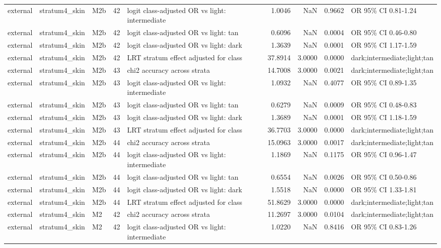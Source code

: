 \begin{tabular}{lllrlrrrl}
external & stratum4\_skin & M2b & 42 & logit class-adjusted OR vs light: intermediate & 1.0046 & NaN & 0.9662 & OR 95\% CI 0.81-1.24 \\
external & stratum4\_skin & M2b & 42 & logit class-adjusted OR vs light: tan & 0.6096 & NaN & 0.0004 & OR 95\% CI 0.46-0.80 \\
external & stratum4\_skin & M2b & 42 & logit class-adjusted OR vs light: dark & 1.3639 & NaN & 0.0001 & OR 95\% CI 1.17-1.59 \\
external & stratum4\_skin & M2b & 42 & LRT stratum effect adjusted for class & 37.8914 & 3.0000 & 0.0000 & dark;intermediate;light;tan \\
external & stratum4\_skin & M2b & 43 & chi2 accuracy across strata & 14.7008 & 3.0000 & 0.0021 & dark;intermediate;light;tan \\
external & stratum4\_skin & M2b & 43 & logit class-adjusted OR vs light: intermediate & 1.0932 & NaN & 0.4077 & OR 95\% CI 0.89-1.35 \\
external & stratum4\_skin & M2b & 43 & logit class-adjusted OR vs light: tan & 0.6279 & NaN & 0.0009 & OR 95\% CI 0.48-0.83 \\
external & stratum4\_skin & M2b & 43 & logit class-adjusted OR vs light: dark & 1.3689 & NaN & 0.0001 & OR 95\% CI 1.18-1.59 \\
external & stratum4\_skin & M2b & 43 & LRT stratum effect adjusted for class & 36.7703 & 3.0000 & 0.0000 & dark;intermediate;light;tan \\
external & stratum4\_skin & M2b & 44 & chi2 accuracy across strata & 15.0963 & 3.0000 & 0.0017 & dark;intermediate;light;tan \\
external & stratum4\_skin & M2b & 44 & logit class-adjusted OR vs light: intermediate & 1.1869 & NaN & 0.1175 & OR 95\% CI 0.96-1.47 \\
external & stratum4\_skin & M2b & 44 & logit class-adjusted OR vs light: tan & 0.6554 & NaN & 0.0026 & OR 95\% CI 0.50-0.86 \\
external & stratum4\_skin & M2b & 44 & logit class-adjusted OR vs light: dark & 1.5518 & NaN & 0.0000 & OR 95\% CI 1.33-1.81 \\
external & stratum4\_skin & M2b & 44 & LRT stratum effect adjusted for class & 51.8629 & 3.0000 & 0.0000 & dark;intermediate;light;tan \\
external & stratum4\_skin & M2 & 42 & chi2 accuracy across strata & 11.2697 & 3.0000 & 0.0104 & dark;intermediate;light;tan \\
external & stratum4\_skin & M2 & 42 & logit class-adjusted OR vs light: intermediate & 1.0220 & NaN & 0.8416 & OR 95\% CI 0.83-1.26 \\

\end{tabular}
